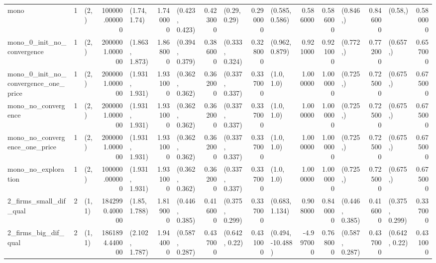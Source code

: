 \begin{tabular}{lrlrlrlrlrlrrlrlr}
mono & 1 & (2,) & 100000.000000 & (1.74, 1.74) & 1.740000 & (0.423, 0.423) & 0.423000 & (0.29, 0.29) & 0.290000 & (0.585, 0.586) & 0.586000 & 0.586000 & (0.846,) & 0.846000 & (0.58,) & 0.580000 \\
mono_0_init_no_convergence & 1 & (2,) & 2000001.000000 & (1.863, 1.873) & 1.868000 & (0.394, 0.379) & 0.386000 & (0.333, 0.324) & 0.328000 & (0.962, 0.879) & 0.921000 & 0.921000 & (0.772,) & 0.772000 & (0.657,) & 0.657000 \\
mono_0_init_no_convergence_one_price & 1 & (2,) & 2000001.000000 & (1.931, 1.931) & 1.931000 & (0.362, 0.362) & 0.362000 & (0.337, 0.337) & 0.337000 & (1.0, 1.0) & 1.000000 & 1.000000 & (0.725,) & 0.725000 & (0.675,) & 0.675000 \\
mono_no_convergence & 1 & (2,) & 2000001.000000 & (1.931, 1.931) & 1.931000 & (0.362, 0.362) & 0.362000 & (0.337, 0.337) & 0.337000 & (1.0, 1.0) & 1.000000 & 1.000000 & (0.725,) & 0.725000 & (0.675,) & 0.675000 \\
mono_no_convergence_one_price & 1 & (2,) & 2000001.000000 & (1.931, 1.931) & 1.931000 & (0.362, 0.362) & 0.362000 & (0.337, 0.337) & 0.337000 & (1.0, 1.0) & 1.000000 & 1.000000 & (0.725,) & 0.725000 & (0.675,) & 0.675000 \\
mono_no_exploration & 1 & (2,) & 100000.000000 & (1.931, 1.931) & 1.931000 & (0.362, 0.362) & 0.362000 & (0.337, 0.337) & 0.337000 & (1.0, 1.0) & 1.000000 & 1.000000 & (0.725,) & 0.725000 & (0.675,) & 0.675000 \\
2_firms_small_dif_qual & 2 & (1, 1) & 1842990.400000 & (1.85, 1.788) & 1.819000 & (0.446, 0.385) & 0.416000 & (0.375, 0.299) & 0.337000 & (0.683, 1.134) & 0.908000 & 0.840000 & (0.446, 0.385) & 0.416000 & (0.375, 0.299) & 0.337000 \\
2_firms_big_dif_qual & 2 & (1, 1) & 1861894.440000 & (2.102, 1.787) & 1.944000 & (0.587, 0.287) & 0.437000 & (0.642, 0.22) & 0.431000 & (0.494, -10.488) & -4.997000 & 0.768000 & (0.587, 0.287) & 0.437000 & (0.642, 0.22) & 0.431000 \\
\bottomrule
\end{tabular}
